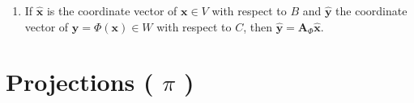 \begin{enumerate}
\begin{enumerate}
        \item If $\hat{\bm{x}}$ is the coordinate vector of $\bm{x} \in V$ with respect to $B$ and $\hat{\bm{y}}$ the coordinate vector of $\bm{y} = \Phi(\bm{x}) \in W$ with respect to $C$, then $\hat{\bm{y}} = \bm{A}_\Phi \hat{\bm{x}}$.
        \hfill \cite{mfml/book/mml/Deisenroth-Faisal-Ong}
    \end{enumerate}    
\end{enumerate}












\section{Projections ( $\pi$ )}


